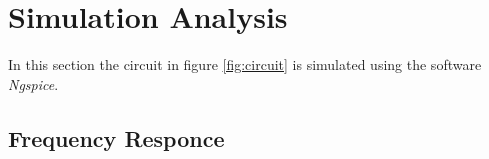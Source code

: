 \section{Simulation Analysis}
\label{sec:simulation}

In this section the circuit in figure \ref{fig:circuit} is simulated
using the software \textit{Ngspice}.



\subsection{Frequency Responce}







